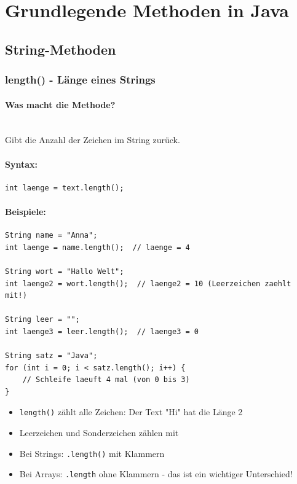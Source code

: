 \begingroup
\let\cleardoublepage\relax


\chapter*{Grundlegende Methoden in Java}
\label{ch:grundlegende-methoden-in-java}
\endgroup


\section*{String-Methoden}

\subsection*{length() - Länge eines Strings}

\subsubsection*{Was macht die Methode?}\\
Gibt die Anzahl der Zeichen im String zurück.

\subsubsection*{Syntax:}
\begin{lstlisting}
int laenge = text.length();
\end{lstlisting}

\subsubsection*{Beispiele:}
\begin{lstlisting}
String name = "Anna";
int laenge = name.length();  // laenge = 4

String wort = "Hallo Welt";
int laenge2 = wort.length();  // laenge2 = 10 (Leerzeichen zaehlt mit!)

String leer = "";
int laenge3 = leer.length();  // laenge3 = 0

String satz = "Java";
for (int i = 0; i < satz.length(); i++) {
    // Schleife laeuft 4 mal (von 0 bis 3)
}
\end{lstlisting}

\begin{achtung}
	\begin{itemize}
		\item \texttt{length()} zählt alle Zeichen: Der Text "Hi" hat die Länge 2
		\item Leerzeichen und Sonderzeichen zählen mit
		\item Bei Strings: \texttt{.length()} mit Klammern
		\item Bei Arrays: \texttt{.length} ohne Klammern - das ist ein wichtiger Unterschied!
	\end{itemize}
\end{achtung}

